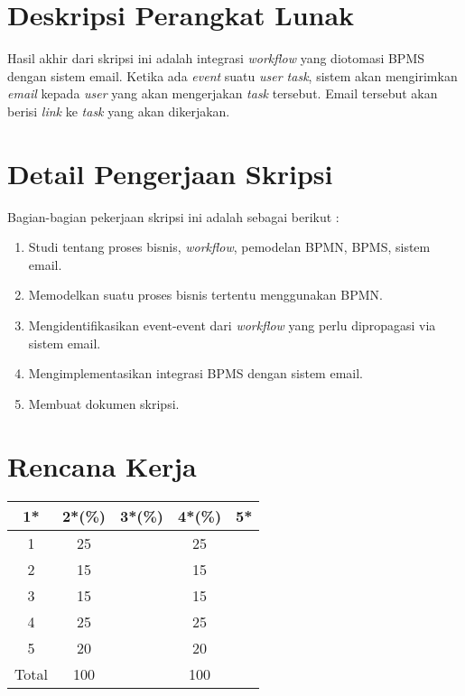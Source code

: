\documentclass[a4paper,twoside]{article}
\begin{document}
\section{Deskripsi Perangkat Lunak}
Hasil akhir dari skripsi ini adalah integrasi \textit{workflow} yang diotomasi BPMS dengan sistem email. Ketika ada \textit{event} suatu \textit{user task}, sistem akan mengirimkan \textit{email} kepada \textit{user} yang akan mengerjakan \textit{task} tersebut. Email tersebut akan berisi \textit{link} ke \textit{task} yang akan dikerjakan. 

		

\section{Detail Pengerjaan Skripsi}
Bagian-bagian pekerjaan skripsi ini adalah sebagai berikut :
	\begin{enumerate}
		\item Studi tentang proses bisnis, \textit{workflow}, pemodelan BPMN, BPMS, sistem email.
		\item Memodelkan suatu proses bisnis tertentu menggunakan BPMN.
		\item Mengidentifikasikan event-event dari \textit{workflow} yang perlu dipropagasi via sistem email.
		\item Mengimplementasikan integrasi BPMS dengan sistem email.
		\item Membuat dokumen skripsi.
	\end{enumerate}

\section{Rencana Kerja}


\begin{center}
  \begin{tabular}{ | c | c | c | c | l |}
    \hline
    1*  & 2*(\%) & 3*(\%) & 4*(\%) &5*\\ \hline \hline
    1   & 25  &   & 25 &  \\ \hline
    2   & 15  &   & 15 &  \\ \hline
    3   & 15  &   & 15 &  \\ \hline
    4   & 25  &   & 25 &  \\ \hline
    5   & 20  &   & 20 &  \\ \hline
    Total  & 100  &   & 100 &  \\ \hline
                          \end{tabular}
\end{center}
\end{document}
